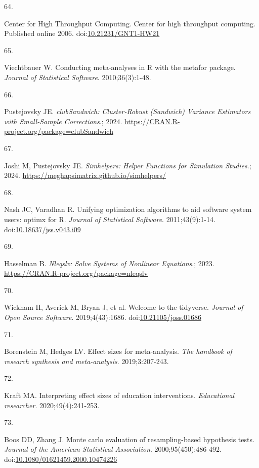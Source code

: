 \documentclass[
  american,
  man, donotrepeattitle,floatsintext]{apa7}
\newlength{\cslhangindent}
\newlength{\csllabelwidth}
\newenvironment{CSLReferences}[2] %
 {\begin{list}{}{%
  \setlength{\itemindent}{0pt}
  \setlength{\leftmargin}{0pt}
  \setlength{\parsep}{0pt}
  \ifodd #1
   \setlength{\leftmargin}{\cslhangindent}
   \setlength{\itemindent}{-1\cslhangindent}
  \fi
  \setlength{\itemsep}{#2\baselineskip}}}
 {\end{list}}
\newcommand{\CSLLeftMargin}[1]{\parbox[t]{\csllabelwidth}{\strut#1\strut}}
\newcommand{\CSLRightInline}[1]{\parbox[t]{\linewidth - \csllabelwidth}{\strut#1\strut}}
\begin{document}
\begin{CSLReferences}{0}{1}
\CSLLeftMargin{64. }%
\CSLRightInline{Center for High Throughput Computing. Center for high throughput computing. Published online 2006. doi:\href{https://doi.org/10.21231/GNT1-HW21}{10.21231/GNT1-HW21}}

\CSLLeftMargin{65. }%
\CSLRightInline{Viechtbauer W. {Conducting meta-analyses in R with the metafor package}. \emph{Journal of Statistical Software}. 2010;36(3):1-48.}

\CSLLeftMargin{66. }%
\CSLRightInline{Pustejovsky JE. \emph{clubSandwich: Cluster-Robust (Sandwich) Variance Estimators with Small-Sample Corrections}.; 2024. \url{https://CRAN.R-project.org/package=clubSandwich}}

\CSLLeftMargin{67. }%
\CSLRightInline{Joshi M, Pustejovsky JE. \emph{Simhelpers: Helper Functions for Simulation Studies}.; 2024. \url{https://meghapsimatrix.github.io/simhelpers/}}

\CSLLeftMargin{68. }%
\CSLRightInline{Nash JC, Varadhan R. Unifying optimization algorithms to aid software system users: {optimx} for {R}. \emph{Journal of Statistical Software}. 2011;43(9):1-14. doi:\href{https://doi.org/10.18637/jss.v043.i09}{10.18637/jss.v043.i09}}

\CSLLeftMargin{69. }%
\CSLRightInline{Hasselman B. \emph{Nleqslv: Solve Systems of Nonlinear Equations}.; 2023. \url{https://CRAN.R-project.org/package=nleqslv}}

\CSLLeftMargin{70. }%
\CSLRightInline{Wickham H, Averick M, Bryan J, et al. Welcome to the {tidyverse}. \emph{Journal of Open Source Software}. 2019;4(43):1686. doi:\href{https://doi.org/10.21105/joss.01686}{10.21105/joss.01686}}

\CSLLeftMargin{71. }%
\CSLRightInline{Borenstein M, Hedges LV. Effect sizes for meta-analysis. \emph{The handbook of research synthesis and meta-analysis}. 2019;3:207-243.}

\CSLLeftMargin{72. }%
\CSLRightInline{Kraft MA. Interpreting effect sizes of education interventions. \emph{Educational researcher}. 2020;49(4):241-253.}

\CSLLeftMargin{73. }%
\CSLRightInline{Boos DD, Zhang J. Monte carlo evaluation of resampling-based hypothesis tests. \emph{Journal of the American Statistical Association}. 2000;95(450):486-492. doi:\href{https://doi.org/10.1080/01621459.2000.10474226}{10.1080/01621459.2000.10474226}}


\end{CSLReferences}
\end{document}
